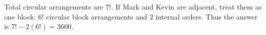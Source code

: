 Total circular arrangements are $7!$. If Mark and Kevin are adjacent, treat them as one block: $6!$ circular block arrangements and $2$ internal orders. Thus the answer is $\boxed{7!-2(6!)=3600}$.
